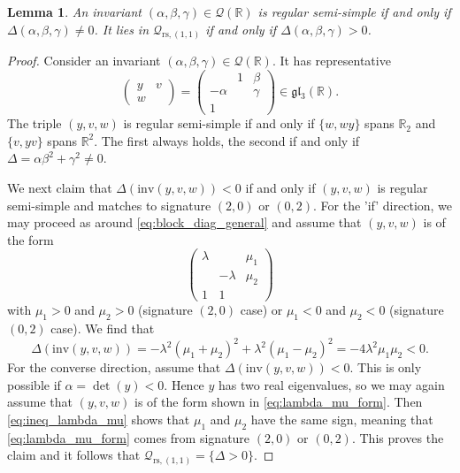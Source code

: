 \documentclass[reqno, 11pt]{amsart} %
\numberwithin{equation}{section}
\theoremstyle{plain}
\newtheorem{lemma}[theorem]{Lemma}
\theoremstyle{definition}
\theoremstyle{remark}
\newcommand{\mr}{\mathrm}
\newcommand{\mbR}{\mathbb{R}}
\newcommand{\mcQ}{\mathcal{Q}}
\newcommand{\mfg}{\mathfrak{g}}
\newcommand{\mfl}{\mathfrak{l}}
\newcommand{\rs}{\mr{rs}}
\newcommand{\mfgl}{\mfg\mfl}
\newcommand{\inv}{\mathrm{inv}}
\begin{document}
\begin{lemma}\label{lem:Q11_connected}
An invariant $(α, β, γ) \in \mcQ(\mbR)$ is regular semi-simple if and only if $Δ(α, β, γ) \neq 0$. It lies in $\mcQ_{\rs, (1,1)}$ if and only if $Δ(α, β, γ) > 0$.
\end{lemma}
\begin{proof}
Consider an invariant $(α, β, γ) \in \mcQ(\mbR)$. It has representative
\begin{equation}\label{eq:rep_for_abc}
\begin{pmatrix}
y & v\\ w &
\end{pmatrix} = \begin{pmatrix}
& 1 & β\\
-α & & γ\\
1 & &
\end{pmatrix} \in \mfgl_3(\mbR).
\end{equation}
The triple $(y, v, w)$ is regular semi-simple if and only if $\{w, wy\}$ spans $\mbR_2$ and $\{v, yv\}$ spans $\mbR^2$. The first always holds, the second if and only if $Δ = αβ^2 + γ^2\neq 0$.

We next claim that $Δ(\inv(y, v, w)) < 0$ if and only if $(y,v,w)$ is regular semi-simple and matches to signature $(2,0)$ or $(0,2)$. For the 'if' direction, we may proceed as around \eqref{eq:block_diag_general} and assume that $(y,v,w)$ is of the form
\begin{equation}\label{eq:lambda_mu_form}
\begin{pmatrix}
λ & & μ_1\\
& -λ & μ_2\\
1 & 1 &
\end{pmatrix}
\end{equation}
with $μ_1 > 0$ and $μ_2 > 0$ (signature $(2,0)$ case) or $μ_1 < 0$ and $μ_2 < 0$ (signature $(0,2)$ case). We find that
\begin{equation}\label{eq:ineq_lambda_mu}
Δ(\inv(y,v,w)) = -λ^2(μ_1 + μ_2)^2 + λ^2(μ_1-μ_2)^2 = -4λ^2μ_1μ_2 < 0.
\end{equation}
For the converse direction, assume that $Δ(\inv(y,v,w)) < 0$. This is only possible if $α = \det(y) < 0$. Hence $y$ has two real eigenvalues, so we may again assume that $(y,v,w)$ is of the form shown in \eqref{eq:lambda_mu_form}. Then \eqref{eq:ineq_lambda_mu} shows that $μ_1$ and $μ_2$ have the same sign, meaning that \eqref{eq:lambda_mu_form} comes from signature $(2,0)$ or $(0,2)$. This proves the claim and it follows that $\mcQ_{\rs, (1,1)} = \{Δ > 0\}$.
\end{proof}
\end{document}

